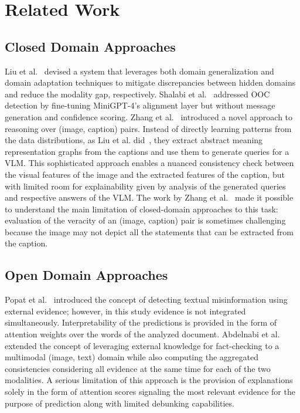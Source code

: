 \section{Related Work}
\subsection{Closed Domain Approaches}
Liu et al.~\cite{liu2023robust} devised a system that leverages both domain generalization and domain adaptation techniques to mitigate discrepancies between hidden domains and reduce the modality gap, respectively.
Shalabi et al.~\cite{shalabi2024leveraging} addressed OOC detection by fine-tuning MiniGPT-4's alignment layer but without message generation and confidence scoring. Zhang et al.~\cite{zhang2023detecting} introduced a novel approach to reasoning over (image, caption) pairs. Instead of directly learning patterns from the data distributions, as Liu et al. did~\cite{liu2020visual}, they extract abstract meaning representation graphs from the captions and use them to generate queries for a VLM. This sophisticated approach enables a nuanced consistency check between the visual features of the image and the extracted features of the caption, but with limited room for explainability given by analysis of the generated queries and respective answers of the VLM. The work by Zhang et al.~\cite{zhang2023detecting} made it possible to understand the main limitation of closed-domain approaches to this task: evaluation of the veracity of an (image, caption) pair is sometimes challenging because the image may not depict all the statements that can be extracted from the caption. 

\subsection{Open Domain Approaches}
Popat et al.~\cite{popat2018declare} introduced the concept of detecting textual misinformation using external evidence; however,
in this study evidence is not integrated simultaneously.
Interpretability of the predictions is provided in the form of attention weights over the words of the analyzed document. Abdelnabi et al.~\cite{abdelnabi2022open} extended the concept of leveraging external knowledge for fact-checking to a multimodal (image, text) domain while also computing the aggregated consistencies considering all evidence at the same time for each of the two modalities.
A serious limitation of this approach is the provision of explanations solely in the form of attention scores signaling the most relevant evidence for the purpose of prediction along with limited debunking capabilities. 

